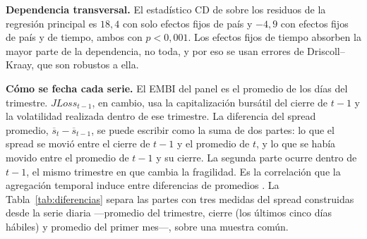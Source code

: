 \textbf{Dependencia transversal.} El estadístico CD de \citet{Pesaran2004} sobre los residuos de la regresión principal es $18{,}4$ con solo efectos fijos de país y $-4{,}9$ con efectos fijos de país y de tiempo, ambos con $p<0{,}001$. Los efectos fijos de tiempo absorben la mayor parte de la dependencia, no toda, y por eso se usan errores de Driscoll--Kraay, que son robustos a ella.

\textbf{Cómo se fecha cada serie.} El EMBI del panel es el promedio de los días del trimestre. $JLoss_{t-1}$, en cambio, usa la capitalización bursátil del cierre de $t-1$ y la volatilidad realizada dentro de ese trimestre. La diferencia del spread promedio, $\overline{s}_t-\overline{s}_{t-1}$, se puede escribir como la suma de dos partes: lo que el spread se movió entre el cierre de $t-1$ y el promedio de $t$, y lo que se había movido entre el promedio de $t-1$ y su cierre. La segunda parte ocurre dentro de $t-1$, el mismo trimestre en que cambia la fragilidad. Es la correlación que la agregación temporal induce entre diferencias de promedios \citep{Working1960}. La Tabla~\ref{tab:diferencias} separa las partes con tres medidas del spread construidas desde la serie diaria ---promedio del trimestre, cierre (los últimos cinco días hábiles) y promedio del primer mes---, sobre una muestra común.

